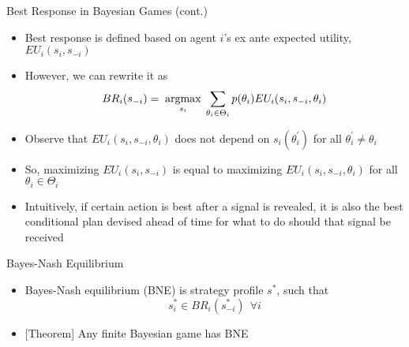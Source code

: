 \documentclass[11pt,aspectratio=169,handout]{beamer}
\begin{document}
  
  \begin{frame}{Best Response in Bayesian Games (cont.)} \small
   \begin{itemize}[<+->]
    \item Best response is defined based on agent $i$'s \alert{ex ante} expected utility, $EU_i(s_i, s_{-i})$
    \item However, we can rewrite it as
    $$BR_i(s_{-i})= \; \underset{s_i}{\operatorname*{argmax}} \; \sum_{\theta_i\in\Theta_i}p(\theta_i)EU_i(s_i,s_{-i},\theta_i)$$
    \item Observe that $EU_i(s_i, s_{-i}, \theta_i)$ \alert{does not depend on} $s_i(\theta_i^\prime)$ for all $\theta_i^\prime \ne \theta_i$
    \item So, maximizing $EU_i(s_i,s_{-i})$ is equal to maximizing $EU_i(s_i,s_{-i},\theta_i)$ for all $\theta_i \in \Theta_i$
    \item Intuitively, if certain action is best after a signal is revealed, it is also the best \alert{conditional plan} devised \alert{ahead of time} for what to do should that signal be received
   \end{itemize}
  \end{frame}
  
  
  \begin{frame}{Bayes-Nash Equilibrium}
    \begin{itemize}
     \item \alert{Bayes-Nash equilibrium (BNE)} is strategy profile $s^*$, such that
     $$s^*_i\in BR_i(s^*_{-i}) ~~\forall i$$
     \item \alert{[Theorem]} Any finite Bayesian game has BNE
    \end{itemize}
  \end{frame}
  
\end{document}
